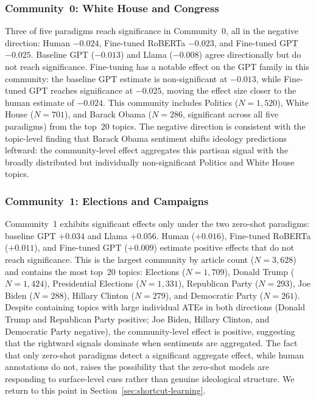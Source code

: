 \subsubsection{Community~0: White House and Congress}

Three of five paradigms reach significance in Community~0, all in the negative direction: Human $-0.024$, Fine-tuned RoBERTa $-0.023$, and Fine-tuned GPT $-0.025$. Baseline GPT ($-0.013$) and Llama ($-0.008$) agree directionally but do not reach significance. Fine-tuning has a notable effect on the GPT family in this community: the baseline GPT estimate is non-significant at $-0.013$, while Fine-tuned GPT reaches significance at $-0.025$, moving the effect size closer to the human estimate of $-0.024$. This community includes Politics ($N = 1{,}520$), White House ($N = 701$), and Barack Obama ($N = 286$, significant across all five paradigms) from the top~20 topics. The negative direction is consistent with the topic-level finding that Barack Obama sentiment shifts ideology predictions leftward: the community-level effect aggregates this partisan signal with the broadly distributed but individually non-significant Politics and White House topics.

\subsubsection{Community~1: Elections and Campaigns}

Community~1 exhibits significant effects only under the two zero-shot paradigms: baseline GPT $+0.034$ and Llama $+0.056$. Human ($+0.016$), Fine-tuned RoBERTa ($+0.011$), and Fine-tuned GPT ($+0.009$) estimate positive effects that do not reach significance. This is the largest community by article count ($N = 3{,}628$) and contains the most top~20 topics: Elections ($N = 1{,}709$), Donald Trump ($N = 1{,}424$), Presidential Elections ($N = 1{,}331$), Republican Party ($N = 293$), Joe Biden ($N = 288$), Hillary Clinton ($N = 279$), and Democratic Party ($N = 261$). Despite containing topics with large individual ATEs in both directions (Donald Trump and Republican Party positive; Joe Biden, Hillary Clinton, and Democratic Party negative), the community-level effect is positive, suggesting that the rightward signals dominate when sentiments are aggregated. The fact that only zero-shot paradigms detect a significant aggregate effect, while human annotations do not, raises the possibility that the zero-shot models are responding to surface-level cues rather than genuine ideological structure. We return to this point in Section~\ref{sec:shortcut-learning}.

